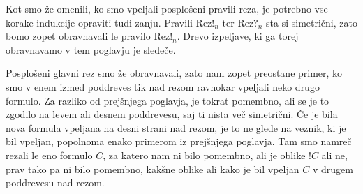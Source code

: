 Kot smo že omenili, ko smo vpeljali posplošeni pravili reza, je potrebno vse korake indukcije opraviti tudi zanju. Pravili Rez!$_n$ ter Rez?$_n$ sta si simetrični, zato bomo zopet obravnavali le pravilo Rez!$_n$. Drevo izpeljave, ki ga torej obravnavamo v tem poglavju je sledeče.
\begin{prooftree}
\end{prooftree}
Posplošeni glavni rez smo že obravnavali, zato nam zopet preostane primer, ko smo v enem izmed poddreves tik nad rezom ravnokar vpeljali neko drugo formulo. Za razliko od prejšnjega poglavja, je tokrat pomembno, ali se je to zgodilo na levem ali desnem poddrevesu, saj ti nista več simetrični. Če je bila nova formula vpeljana na desni strani nad rezom, je to ne glede na veznik, ki je bil vpeljan, popolnoma enako primerom iz prejšnjega poglavja. Tam smo namreč rezali le eno formulo $C$, za katero nam ni bilo pomembno, ali je oblike $!C$ ali ne, prav tako pa ni bilo pomembno, kakšne oblike ali kako je bil vpeljan $C$ v drugem poddrevesu nad rezom.

